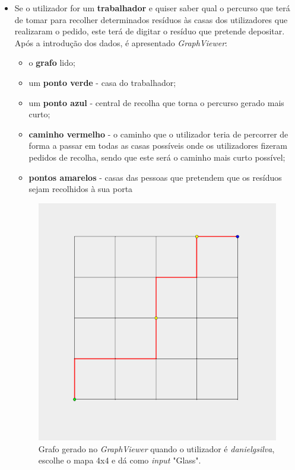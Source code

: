 \documentclass[article, a4paper, 12pt, oneside]{memoir}
\begin{document}
\begin{itemize}
	\item Se o utilizador for um \textbf{trabalhador} e quiser saber qual o percurso que terá de tomar para recolher determinados resíduos às casas dos utilizadores que realizaram o pedido, este terá de digitar o resíduo que pretende depositar. Após a introdução dos dados, é apresentado \textit{GraphViewer}:
	\begin{itemize}
		\item o \textbf{grafo} lido;
		\item um \textbf{ponto verde} - casa do trabalhador;
		\item um \textbf{ponto azul} - central de recolha que torna o percurso gerado mais curto;
		\item \textbf{caminho vermelho} - o caminho que o utilizador teria de percorrer de forma a passar em todas as casas possíveis onde os utilizadores fizeram pedidos de recolha, sendo que este será o caminho mais curto possível;
		\item \textbf{pontos amarelos} - casas das pessoas que pretendem que os resíduos sejam recolhidos à sua porta		
	\end{itemize}
	
\begin{figure}[h!]
  	\centerline{\includegraphics[scale=0.7]{wasteapp_4x4danielgsilvaglass.png}}
  	\caption{Grafo gerado no \textit{GraphViewer} quando o utilizador é \textit{danielgsilva}, escolhe o mapa 4x4 e dá como \textit{input} "Glass".}
\end{figure}
	
\end{itemize}
\end{document}
